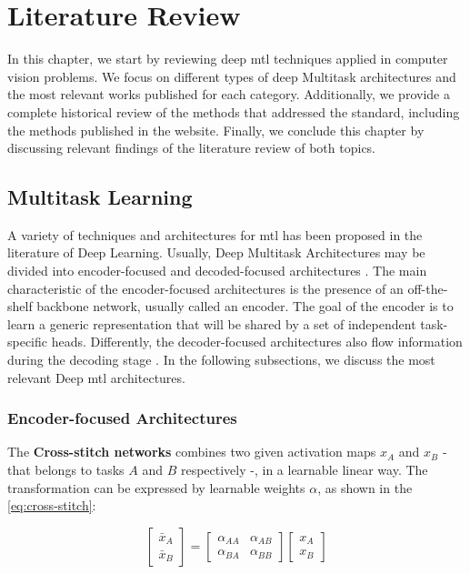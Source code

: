 \section{Literature Review} \label{sec:literature}

In this chapter, we start by reviewing deep \acl{mtl} techniques applied in computer vision problems. We focus on different types of deep Multitask architectures and the most relevant works published for each category. Additionally, we provide a complete historical review of the methods that addressed the \icao standard, including the methods published in the \fvcongoing website. Finally, we conclude this chapter by discussing relevant findings of the literature review of both topics.

\subsection{Multitask Learning}

A variety of techniques and architectures for \acs{mtl} has been proposed in the literature of Deep Learning. Usually, Deep Multitask Architectures may be divided into encoder-focused and decoded-focused architectures \citep{vandenhende2021multi}. The main characteristic of the encoder-focused architectures \citep{kendall2018multi, chen2018gradnorm, sener2018multi} is the presence of an off-the-shelf backbone network, usually called an encoder. The goal of the encoder is to learn a generic representation that will be shared by a set of independent task-specific heads. Differently, the decoder-focused architectures also flow information during the decoding stage \citep{xu2018pad, zhang2018joint, vandenhende2020mti}. In the following subsections, we discuss the most relevant Deep \acl{mtl} architectures.

\subsubsection{Encoder-focused Architectures}

The \textbf{Cross-stitch networks} \citep{misra2016cross} combines two given activation maps $x_A$ and $x_B$ - that belongs to tasks $A$ and $B$ respectively -, in a learnable linear way. The transformation can be expressed by learnable weights $\alpha$, as shown in the \autoref{eq:cross-stitch}:

\begin{equation}
\label{eq:cross-stitch}
\begin{bmatrix}
\bar{x}_A\\ 
\bar{x}_B
\end{bmatrix} = 
\begin{bmatrix}
\alpha_{AA} & \alpha_{AB} \\ 
\alpha_{BA} & \alpha_{BB}
\end{bmatrix}
\begin{bmatrix}
x_A \\ 
x_B
\end{bmatrix}
\end{equation}

